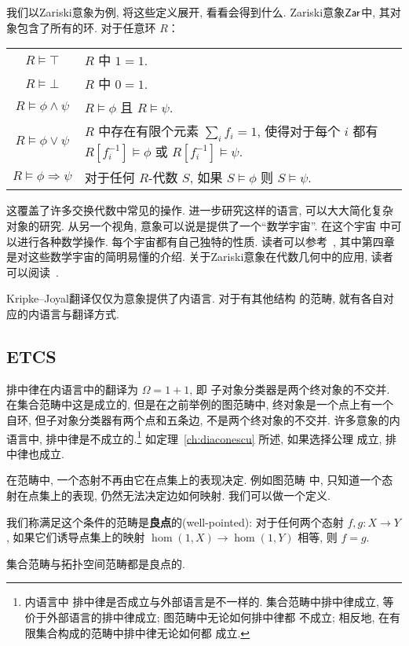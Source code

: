 我们以Zariski意象为例, 将这些定义展开, 看看会得到什么.
Zariski意象\(\textsf{Zar}\)中, 其对象包含了所有的环.
对于任意环 \(R\)：
\begin{center}
\begin{tabular}{c @{\(\color{gray}{}\iff{}\)} p{}}\hline
\(R \vDash \top\) & \(R\) 中 \(1 = 1\).\\
\(R \vDash \bot\) & \(R\) 中 \(0 = 1\).\\
\(R \vDash \phi\wedge\psi\) & \(R \vDash \phi\)
  且 \(R \vDash \psi\).\\
\(R \vDash \phi\vee\psi\) & \(R\) 中存在有限个元素
  \(\sum_i f_i = 1\), 使得对于每个 \(i\) 都有
  \(R[f_i^{-1}] \vDash \phi\) 或
  \(R[f_i^{-1}]\vDash \psi\).\\
\(R \vDash \phi\Rightarrow\psi\) & 对于任何 \(R\)-代数
  \(S\), 如果 \(S \vDash \phi\) 则 \(S \vDash \psi\).\\\hline
\end{tabular}
\end{center}
这覆盖了许多交换代数中常见的操作.
进一步研究这样的语言, 可以大大简化复杂对象的研究.
从另一个视角, 意象可以说是提供了一个“数学宇宙”. 在这个宇宙
中可以进行各种数学操作. 每个宇宙都有自己独特的性质.
读者可以参考~\cite{oliveri:2022:structure},
其中第四章是对这些数学宇宙的简明易懂的介绍.
关于Zariski意象在代数几何中的应用, 读者可以阅读~\cite{blechschmidt:2021:internal}.

Kripke--Joyal翻译仅仅为意象提供了内语言. 对于有其他结构
的范畴, 就有各自对应的内语言与翻译方式.

\subsection{ETCS}
排中律在内语言中的翻译为 \(\Omega = 1 + 1\), 即
子对象分类器是两个终对象的不交并. 在集合范畴中这是成立的,
但是在之前举例的图范畴中, 终对象是一个点上有一个自环,
但子对象分类器有两个点和五条边, 不是两个终对象的不交并.
许多意象的内语言中, 排中律是不成立的.\footnote{内语言中
排中律是否成立与外部语言是不一样的. 集合范畴中排中律成立,
等价于外部语言的排中律成立; 图范畴中无论如何排中律都
不成立; 相反地, 在有限集合构成的范畴中排中律无论如何都
成立.} 如定理~\ref{ch:diaconescu} 所述, 如果选择公理
成立, 排中律也成立.


在范畴中, 一个态射不再由它在点集上的表现决定. 例如图范畴
中, 只知道一个态射在点集上的表现, 仍然无法决定边如何映射.
我们可以做一个定义.
\begin{definition}
我们称满足这个条件的范畴是\textbf{良点}的(well-pointed):
对于任何两个态射 \(f, g : X \to Y\),
如果它们诱导点集上的映射 \(\hom(1, X) \to \hom(1,Y)\)
相等, 则 \(f = g\).
\end{definition}
集合范畴与拓扑空间范畴都是良点的.

